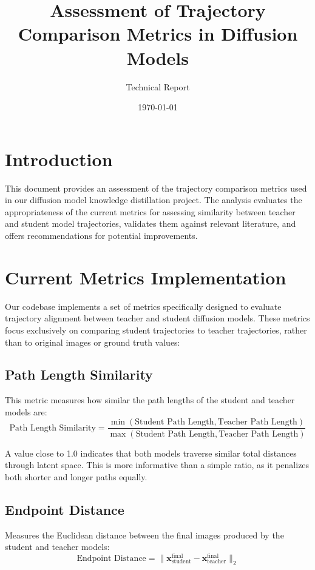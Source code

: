 \documentclass{article}
\title{Assessment of Trajectory Comparison Metrics in Diffusion Models}
\author{Technical Report}
\date{\today}
\begin{document}
\maketitle

\section{Introduction}
This document provides an assessment of the trajectory comparison metrics used in our diffusion model knowledge distillation project. The analysis evaluates the appropriateness of the current metrics for assessing similarity between teacher and student model trajectories, validates them against relevant literature, and offers recommendations for potential improvements.

\section{Current Metrics Implementation}
Our codebase implements a set of metrics specifically designed to evaluate trajectory alignment between teacher and student diffusion models. These metrics focus exclusively on comparing student trajectories to teacher trajectories, rather than to original images or ground truth values:

\subsection{Path Length Similarity}
This metric measures how similar the path lengths of the student and teacher models are:
\begin{equation}
\text{Path Length Similarity} = \frac{\min(\text{Student Path Length}, \text{Teacher Path Length})}{\max(\text{Student Path Length}, \text{Teacher Path Length})}
\end{equation}

A value close to 1.0 indicates that both models traverse similar total distances through latent space. This is more informative than a simple ratio, as it penalizes both shorter and longer paths equally.

\subsection{Endpoint Distance}
Measures the Euclidean distance between the final images produced by the student and teacher models:
\begin{equation}
\text{Endpoint Distance} = \| \mathbf{x}_{\text{student}}^{\text{final}} - \mathbf{x}_{\text{teacher}}^{\text{final}} \|_2
\end{equation}
\end{document}
